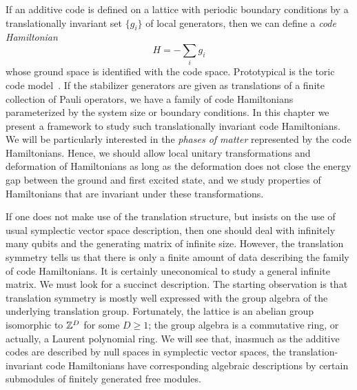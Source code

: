 
If an additive code is defined on a lattice with periodic boundary conditions
by a translationally invariant set $\{g_i\}$ of local generators,
then we can define a \emph{code Hamiltonian}
\[
 H = - \sum_i g_i
\]
whose ground space is identified with the code space.
Prototypical is the toric code model~\cite{Kitaev2003Fault-tolerant}.
If the stabilizer generators are given as translations of a finite collection of Pauli operators,
we have a family of code Hamiltonians parameterized by the system size or boundary conditions.
In this chapter we present a framework to study such translationally invariant code Hamiltonians.
We will be particularly interested in the \emph{phases of matter} represented by the code Hamiltonians.
Hence, we should allow local unitary transformations and deformation of Hamiltonians 
as long as the deformation does not close the energy gap between the ground and first excited state,
and we study properties of Hamiltonians that are invariant under these transformations.

If one does not make use of the translation structure, 
but insists on the use of usual symplectic vector space description,
then one should deal with infinitely many qubits and the generating matrix of infinite size.
However, the translation symmetry tells us 
that there is only a finite amount of data describing the family of code Hamiltonians.
It is certainly uneconomical to study a general infinite matrix.
We must look for a succinct description.
The starting observation is that translation symmetry is mostly well expressed
with the group algebra of the underlying translation group.
Fortunately, the lattice is an abelian group isomorphic to $\mathbb{Z}^D$ for some $D \ge 1$;
the group algebra is a commutative ring, or actually, a Laurent polynomial ring.
We will see that, inasmuch as the additive codes are described by null spaces in symplectic vector spaces,
the translation-invariant code Hamiltonians have corresponding algebraic descriptions
by certain submodules of finitely generated free modules.




